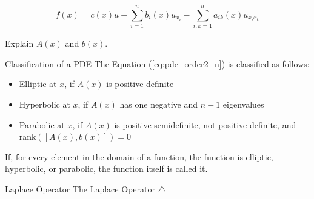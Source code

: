 

\begin{equation}
    f(x) = c(x) u + \sum_{i=1}^{n}b_i(x)u_{x_{i}} 
    - \sum_{i,k=1}^{n}a_{ik}(x)u_{x_ix_k}
    \label{eq:pde_order2_n}
\end{equation}

Explain $A(x)$ and $b(x)$.

\begin{defn}{Classification of a PDE}
The Equation (\ref{eq:pde_order2_n}) is classified as follows:
    \begin{itemize}
        \item Elliptic at $x$, if $A(x)$ is positive definite
        \item Hyperbolic at $x$, if $A(x)$ has one negative and $n-1$ eigenvalues 
        \item Parabolic at $x$, if $A(x)$ is positive semidefinite, not positive definite, and rank$([A(x), b(x)])=0$  
    \end{itemize}

If, for every element in the domain of a function, the function is elliptic, hyperbolic, or parabolic, the function itself is called it.
\end{defn}


\begin{defn}{Laplace Operator}
   The Laplace Operator $\triangle$
\end{defn}